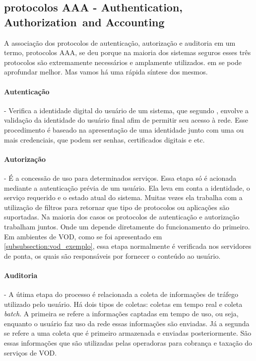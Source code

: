 \subsection{protocolos AAA - Authentication,
Authorization\, and Accounting}
\label{subsection:AAA}
A associa\c{c}\~ao dos protocolos de autentica\c{c}\~ao, autoriza\c{c}\~ao e auditoria em um termo, protocolos AAA, se deu porque na maioria dos sistemas seguros esses tr\^es protocolos s\~ao extremamente necess\'arios e amplamente utilizados. em \cite{metz1999aaa} se pode aprofundar melhor. Mas vamos h\'a uma r\'apida s\'intese dos mesmos.
\paragraph{Autentica\c{c}\~ao}- Verifica a identidade digital do usu\'ario de um sistema, que segundo \cite{metz1999aaa}, envolve a valida\c{c}\~ao da identidade do usu\'ario final afim de permitir seu acesso \`a rede.
\newline
Esse procedimento \'e baseado na apresenta\c{c}\~ao de uma identidade junto com uma ou mais credenciais, que podem ser senhas, certificados digitais e etc.
\paragraph{Autoriza\c{c}\~ao}- \'E a concess\~ao de uso para determinados servi\c{c}os. Essa etapa s\'o \'e acionada mediante a autentica\c{c}\~ao pr\'evia de um usu\'ario. Ela leva em conta a identidade, o servi\c{c}o requerido e o estado atual do sistema. Muitas vezes ela trabalha com a utiliza\c{c}\~ao de filtros para retornar que tipo de protocolos ou aplica\c{c}\~oes s\~ao suportadas.
\newline
Na maioria dos casos os protocolos de autentica\c{c}\~ao e autoriza\c{c}\~ao trabalham juntos. Onde um depende diretamente do funcionamento do primeiro. Em ambientes de VOD, como se foi apresentado em \ref{subsubsection:vod_exemplo}, essa etapa normalmente \'e verificada nos servidores de ponta, os quais s\~ao respons\'aveis por fornecer o conte\'udo ao usu\'ario.
\paragraph{Auditoria}- A \'utima etapa do processo \'e relacionada a coleta de informa\c{c}\~oes de tr\'afego utilizado pelo usu\'ario. 
\newline
H\'a dois tipos de coletas: coletas em tempo real e coleta \textit{batch}. A primeira se refere a informa\c{c}\~oes captadas em tempo de uso, ou seja, enquanto o usu\'ario faz uso da rede essas informa\c{c}\~oes s\~ao enviadas. J\'a a segunda se refere a uma coleta que \'e primeiro armazenada e enviadas posteriormente. 
\newline
S\~ao essas informa\c{c}\~oes que s\~ao utilizadas pelas operadoras para cobran\c{c}a e taxa\c{c}\~ao do servi\c{c}os de VOD.